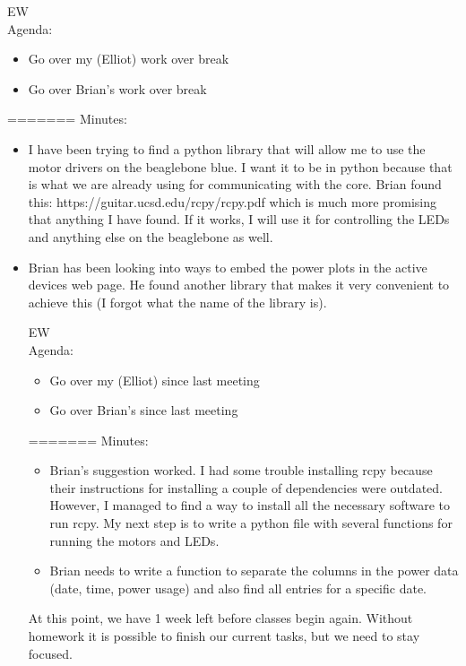\documentclass[fontsize=11pt, %
                             paper=letter, %
                             openany, %
                             captions=tableheading,
                             index=totoc,
                             hyperref]{labbook}
\begin{document}
EW\\
Agenda:
\begin{itemize}
\item Go over my (Elliot) work over break
\item Go over Brian's work over break
\end{itemize}
=======
Minutes:
\begin{itemize}
\item I have been trying to find a python library that will allow me to use the motor drivers on the beaglebone blue. I want it to be in python because that is what we are already using for communicating with the core. Brian found this: https://guitar.ucsd.edu/rcpy/rcpy.pdf which is much more promising that anything I have found. If it works, I will use it for controlling the LEDs and anything else on the beaglebone as well.
\item Brian has been looking into ways to embed the power plots in the active devices web page. He found another library that makes it very convenient to achieve this (I forgot what the name of the library is).

EW\\
Agenda:
\begin{itemize}
\item Go over my (Elliot) since last meeting
\item Go over Brian's since last meeting
\end{itemize}
=======
Minutes:
\begin{itemize}
\item Brian's suggestion worked. I had some trouble installing rcpy because their instructions for installing a couple of dependencies were outdated. However, I managed to find a way to install all the necessary software to run rcpy. My next step is to write a python file with several functions for running the motors and LEDs.
\item Brian needs to write a function to separate the columns in the power data (date, time, power usage) and also find all entries for a specific date. 
\end{itemize}

At this point, we have 1 week left before classes begin again. Without homework it is possible to finish our current tasks, but we need to stay focused.
\end{itemize}
\end{document}
